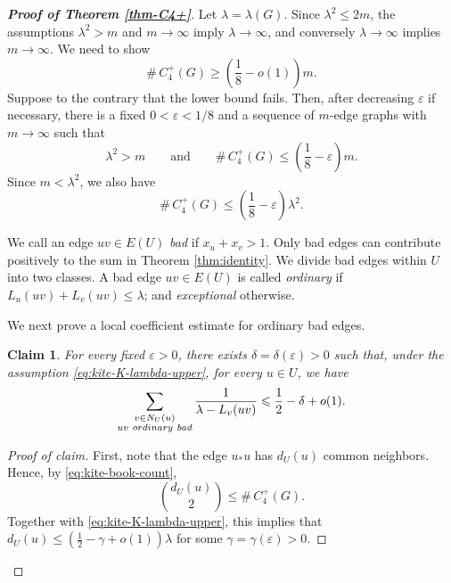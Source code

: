 \documentclass[10pt,a4paper]{amsart}
\newtheorem{claim}[theorem]{Claim}
\renewcommand{\le}{\leqslant}
\renewcommand{\ge}{\geqslant}
\begin{document}
\begin{proof}[{\bf Proof of Theorem \ref{thm-C4+}}] 
Let $ \lambda=\lambda(G)$. 
Since $  \lambda^2\le 2m$, 
the assumptions \(\lambda^2>m\) and \(m\to\infty\) imply
\(\lambda\to\infty\), and conversely \(\lambda\to\infty\) implies
\(m\to\infty\). We need to show 
$$ 
\texttt{\#}\,C_4^+ (G)\ge \left( 
\frac{1}{8}-o(1) \right)m.$$ 
Suppose to the contrary that the lower bound fails.  Then, after decreasing
\(\varepsilon\) if necessary, there is a fixed
\(0<\varepsilon<1/8\) and a sequence of \(m\)-edge graphs with \(m\to\infty\)
such that
\begin{equation*}
        \lambda^2>m
        \qquad\text{and}\qquad
        \texttt{\#}\,C_4^+ (G) \le \left(\frac18-\varepsilon\right)m .
\end{equation*} 
Since \(m<\lambda^2\), we also have
\begin{equation}\label{eq:kite-K-lambda-upper}
        \texttt{\#}\,C_4^+ (G) \le \left(\frac18-\varepsilon\right)\lambda^2.
\end{equation}




We call an edge \(uv\in E(U)\) \emph{bad} if
$   x_u+x_v>1$. 
Only bad edges can contribute positively to the sum in Theorem \ref{thm:identity}. 
We divide bad edges within $U$ into two classes.  A bad edge \(uv\in E(U)\) is called
\emph{ordinary} if
$   L_u(uv)+L_v(uv)\le \lambda$; 
and \emph{exceptional} otherwise.



We next prove a local coefficient estimate for ordinary bad edges.

\begin{claim}\label{lem:kite-local-coeff}
For every fixed \(\varepsilon>0\), there exists
\(\delta=\delta(\varepsilon)>0\) such that, under the assumption
\eqref{eq:kite-K-lambda-upper}, for every \(u\in U\), we have 
\[
        \sum_{\substack{v\in N_U(u)\\ uv\ {\rm ordinary\ bad}}}
        \frac{1}{\lambda-L_v(uv)}
        \le
        \frac12-\delta+o(1).
\]
\end{claim}

\begin{proof}[Proof of claim]
First, note that the edge \(u_*u\) has \(d_U(u)\) common neighbors.  Hence, by
\eqref{eq:kite-book-count},
\[
     {d_U(u)\choose2} \le \texttt{\#}\,C_4^+ (G).
\]
Together with \eqref{eq:kite-K-lambda-upper}, this implies that
$   d_U(u)\le \left(\frac12-\gamma+o(1)\right)\lambda$ 
for some \(\gamma=\gamma(\varepsilon)>0\).


\end{proof}
\end{proof}
\end{document}
